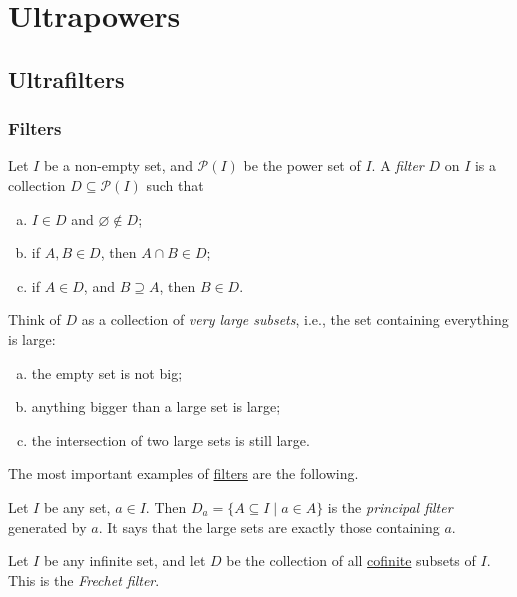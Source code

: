 \chapter{Ultrapowers}
\section{Ultrafilters}
\subsection{Filters}
\begin{definition}[Filter]\label{def:filter}
	Let \(I\) be a non-empty set, and \(\mathcal{P} (I)\) be the power set of \(I\). A \emph{filter} \(D\) on \(I\) is a collection \(D \subseteq \mathcal{P} (I)\) such that
	\begin{enumerate}[(a)]
		\item \(I\in D\) and \(\varnothing \notin D\);
		\item if \(A, B\in D\), then \(A \cap B\in D\);
		\item if \(A\in D\), and \(B \supseteq A\), then \(B\in D\).
	\end{enumerate}
\end{definition}

\begin{intuition}
	Think of \(D\) as a collection of \emph{very large subsets}, i.e., the set containing everything is large:
	\begin{enumerate}[(a)]
		\item the empty set is not big;
		\item anything bigger than a large set is large;
		\item the intersection of two large sets is still large.
	\end{enumerate}
\end{intuition}

The most important examples of \hyperref[def:filter]{filters} are the following.

\begin{eg}\label{eg:principal-filter}
	Let \(I\) be any set, \(a\in I\). Then \(D_a = \{A \subseteq I \mid a\in A\}\) is the \emph{principal filter} generated by \(a\). It says that the large sets are exactly those containing \(a\).
\end{eg}

\begin{eg}\label{eg:Frechet-filter}
	Let \(I\) be any infinite set, and let \(D\) be the collection of all \hyperref[def:cofinite]{cofinite} subsets of \(I\). This is the \emph{Frechet filter}.
\end{eg}

